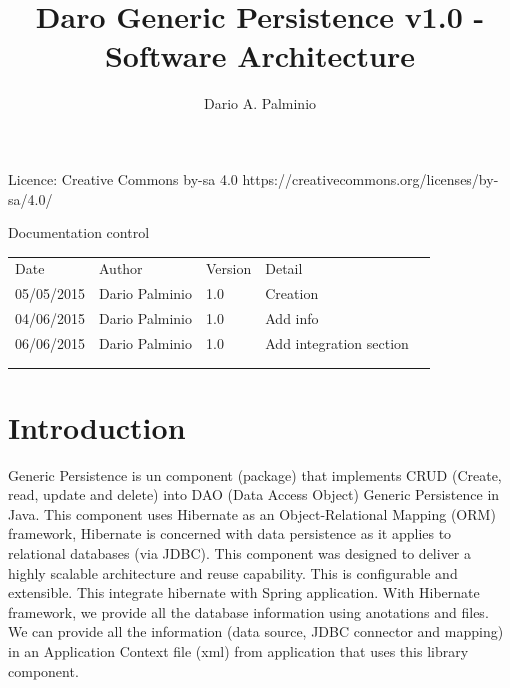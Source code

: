 \documentclass[a4paper,11pt]{book}
\title{Daro Generic Persistence v1.0 - Software Architecture}
\author{Dario A. Palminio}
\begin{document}
\maketitle
Licence: Creative Commons by-sa 4.0
\newline
https://creativecommons.org/licenses/by-sa/4.0/
\newline

Documentation control

\begin{table}[h]
\begin{tabular}{lllll}
\cline{1-4}
\multicolumn{1}{|l|}{Date}       & \multicolumn{1}{l|}{Author}         & \multicolumn{1}{l|}{Version} & \multicolumn{1}{l|}{Detail}   &  \\ \cline{1-4}
\multicolumn{1}{|l|}{05/05/2015} & \multicolumn{1}{l|}{Dario Palminio} & \multicolumn{1}{l|}{1.0}     & \multicolumn{1}{l|}{Creation} &  \\ \cline{1-4}
\multicolumn{1}{|l|}{04/06/2015} & \multicolumn{1}{l|}{Dario Palminio} & \multicolumn{1}{l|}{1.0}     & \multicolumn{1}{l|}{Add info} &  \\ \cline{1-4}
\multicolumn{1}{|l|}{06/06/2015} & \multicolumn{1}{l|}{Dario Palminio} & \multicolumn{1}{l|}{1.0}     & \multicolumn{1}{l|}{Add integration section} &  \\ \cline{1-4}
                                 &                                     &                              &                               &  \\
                                 &                                     &                              &                               & 
\end{tabular}
\end{table}

\tableofcontents

\chapter{Introduction}
Generic Persistence is un component (package) that implements CRUD (Create, read, update and delete) into DAO (Data Access Object) Generic Persistence in Java. This component uses Hibernate as an Object-Relational Mapping (ORM) framework, Hibernate is concerned with data persistence as it applies to relational databases (via JDBC). This component was designed to deliver a highly scalable architecture and reuse capability. This is configurable and extensible. This integrate hibernate with Spring application. With Hibernate framework, we provide all the database information using anotations and files. We can provide all the information (data source, JDBC connector and mapping) in an Application Context file (xml) from application that uses this library component.
\end{document}
